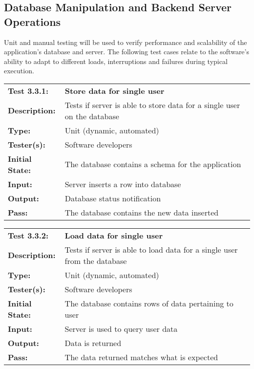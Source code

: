 \documentclass{article}
\newenvironment{testcase}
    {
    \begin{center}
    \begin{mdframed}[
        userdefinedwidth=15.5cm,
        leftmargin=1cm,
        rightmargin=1cm
        ]
    \begin{tabular}{p{2.5cm} p{9cm}}
    }
    {
    \end{tabular}
    \end{mdframed}
    \end{center}
    }
\newcommand{\tctit}[2]{\textbf{#1} & \textbf{#2}}
\newcommand{\tcdesc}{\textbf{Description:}}
\newcommand{\tctype}{\textbf{Type:}}
\newcommand{\testers}{\textbf{Tester(s):}}
\newcommand{\tcinit}{\textbf{Initial State:}}
\newcommand{\tcin}{\textbf{Input:}}
\newcommand{\tcout}{\textbf{Output:}}
\newcommand{\tcpass}{\textbf{Pass:}}
\begin{document}
\subsection{Database Manipulation and Backend Server Operations}
Unit and manual testing will be used to verify performance and scalability of the application’s database and server. The following test cases relate to the software’s ability to adapt to different loads, interruptions and failures during typical execution.

\begingroup
\begin{testcase}
    \tctit{Test 3.3.1:}{Store data for single user} \\
    \tcdesc & Tests if server is able to store data for a single user on the database \\
    \tctype & Unit (dynamic, automated) \\
    \testers & Software developers \\
    \tcinit & The database contains a schema for the application\\
    \tcin & Server inserts a row into database \\
    \tcout & Database status notification \\
    \tcpass & The database contains the new data inserted\\
\end{testcase}
\endgroup

\begingroup
\begin{testcase}
\tctit{Test 3.3.2:}{Load data for single user} \\
    \tcdesc & Tests if server is able to load data for a single user from the database \\
    \tctype & Unit (dynamic, automated) \\
    \testers & Software developers \\
    \tcinit & The database contains rows of data pertaining to user \\
    \tcin & Server is used to query user data \\
    \tcout & Data is returned \\
    \tcpass & The data returned matches what is expected \\
\end{testcase}
\endgroup
\end{document}
